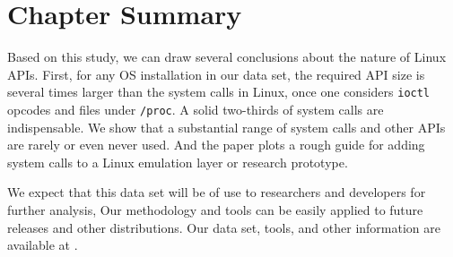 \section{Chapter Summary}
\label{sec:syspop:summary}

Based on this study, we can draw several conclusions about the nature of Linux APIs.
First, for any OS installation in our data set, the required API size
is several times larger than the \syscallnum{} system calls in Linux, once one considers
{\tt ioctl} opcodes and files under {\tt /proc}.  A solid two-thirds of system calls are indispensable.
We show that a substantial range of system calls and other APIs are rarely or even never used.
And the paper plots a rough guide for adding system calls to a Linux emulation layer or research prototype.

We expect that this data set will be of use to researchers and developers for further analysis,
Our methodology and tools can be easily applied to future releases and other distributions.
Our data set, tools, and other information are available at \projecturl{}.

